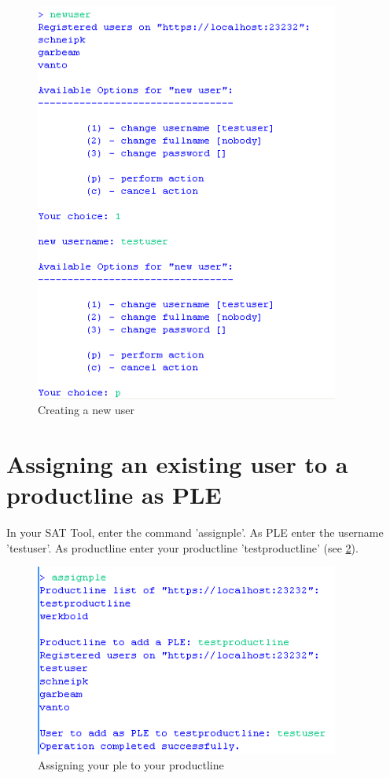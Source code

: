 \begin{figure}[h!]
\begin{center}
\includegraphics[width=10cm]{tutorial2.png}
   \caption{Creating a new user}
   \label{user}
\end{center}
\end{figure}\par


\section{Assigning an existing user to a productline as PLE}
In your SAT Tool, enter the command 'assignple'. 
As PLE enter the username 'testuser'. As productline enter your productline 'testproductline' 
(see \ref{ple}).

\begin{figure}[h!]
\begin{center}
\includegraphics[width=10cm]{tutorial3.png}
   \caption{Assigning your ple to your productline}
   \label{ple}
\end{center}
\end{figure}\par



